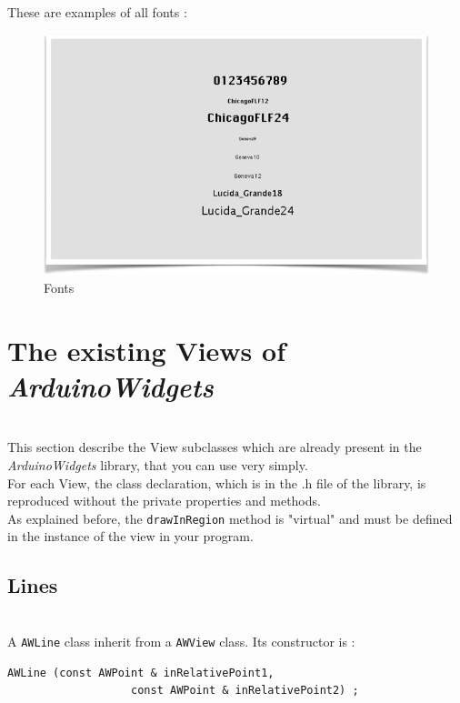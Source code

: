 \documentclass[a4paper,11pt]{extarticle}
\begin{document}
~\\ These are examples of all fonts :
\begin{figure}[htbp]
   \centering
   \includegraphics[scale=0.7]{AWFig91.png} 
   \caption{Fonts}
   \label{fig:91 }
\end{figure}


\newpage
\section{The existing Views of \emph{ArduinoWidgets}}

~\\ This section describe the View subclasses which are already present in the \emph{ArduinoWidgets} library, that you can use very simply.
~\\ For each View, the class declaration, which is in the .h file of the library, is reproduced without the private properties and methods.
~\\ As explained before, the \texttt{drawInRegion} method is "virtual" and must be defined in the instance of the view in your program.

\subsection{Lines}

~\\ A \texttt{AWLine} class inherit from a \texttt{AWView} class. Its constructor is :

\begin{lstlisting}[language=Arduinonl]
  AWLine (const AWPoint & inRelativePoint1,
                   const AWPoint & inRelativePoint2) ;
\end{lstlisting}
\end{document}
